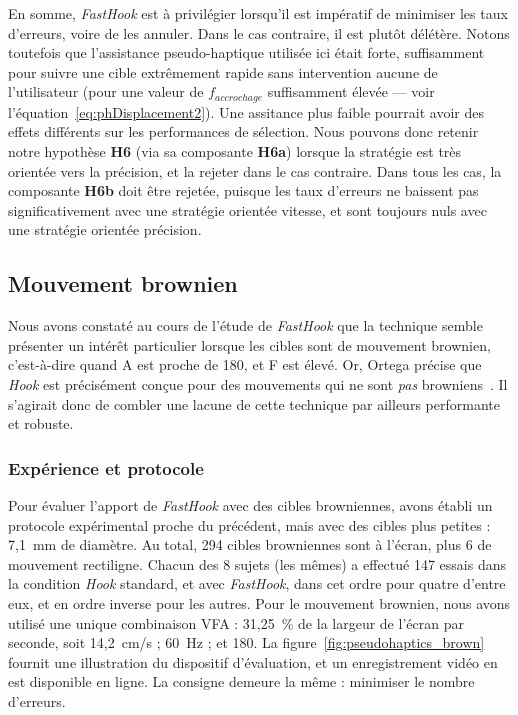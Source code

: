 	En somme, \emph{FastHook} est à privilégier lorsqu'il est impératif de minimiser les taux d'erreurs, voire de les annuler. Dans le cas contraire, il est plutôt délétère. Notons toutefois que l'assistance pseudo-haptique utilisée ici était forte, suffisamment pour suivre une cible extrêmement rapide sans intervention aucune de l'utilisateur (pour une valeur de $f_{accrochage}$ suffisamment élevée --- voir l'équation~\ref{eq:phDisplacement2}). Une assitance plus faible pourrait avoir des effets différents sur les performances de sélection. Nous pouvons donc retenir notre hypothèse \textbf{H6} (via sa composante \textbf{H6a}) lorsque la stratégie est très orientée vers la précision, et la rejeter dans le cas contraire. Dans tous les cas, la composante \textbf{H6b} doit être rejetée, puisque les taux d'erreurs ne baissent pas significativement avec une stratégie orientée vitesse, et sont toujours nuls avec une stratégie orientée précision.
	
	\subsection{Mouvement brownien}
	\label{sub:fastHookBrown}
	Nous avons constaté au cours de l'étude de \emph{FastHook} que la technique semble présenter un intérêt particulier lorsque les cibles sont de mouvement brownien, c'est-à-dire quand A est proche de 180\textdegree{}, et F est élevé. Or, Ortega précise que \emph{Hook} est précisément conçue pour des mouvements qui ne sont \emph{pas} browniens~\cite{ortega2013hook}. Il s'agirait donc de combler une lacune de cette technique par ailleurs performante et robuste.
	
	\subsubsection{Expérience et protocole}
	Pour évaluer l'apport de \emph{FastHook} avec des cibles browniennes, avons établi un protocole expérimental proche du précédent, mais avec des cibles plus petites : 7,1~mm de diamètre. Au total, 294 cibles browniennes sont à l'écran, plus 6 de mouvement rectiligne. Chacun des 8 sujets (les mêmes) a effectué 147 essais dans la condition \emph{Hook} standard, et avec \emph{FastHook}, dans cet ordre pour quatre d'entre eux, et en ordre inverse pour les autres. Pour le mouvement brownien, nous avons utilisé une unique combinaison VFA : 31,25~\%{} de la largeur de l'écran par seconde, soit 14,2~cm/s ; 60~Hz ; et 180\textdegree{}. La figure~\ref{fig:pseudohaptics_brown} fournit une illustration du dispositif d'évaluation, et un enregistrement vidéo en est disponible en ligne.\footnotemark{} La consigne demeure la même : minimiser le nombre d'erreurs.
	
